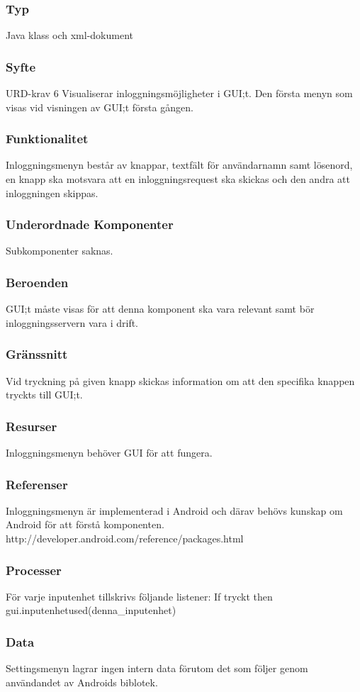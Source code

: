 \subsubsection{Typ}
Java klass och xml-dokument

\subsubsection{Syfte}
URD-krav 6
Visualiserar inloggningsmöjligheter i GUI;t. Den första menyn som visas vid visningen av GUI;t första gången. 

\subsubsection{Funktionalitet}
Inloggningsmenyn består av knappar, textfält för användarnamn samt lösenord, en knapp ska motsvara att en inloggningsrequest ska skickas och den andra att inloggningen skippas.

\subsubsection{Underordnade Komponenter}
Subkomponenter saknas.

\subsubsection{Beroenden}
GUI;t måste visas för att denna komponent ska vara relevant samt bör inloggningsservern vara i drift.

\subsubsection{Gränssnitt}
Vid tryckning på given knapp skickas information om att den specifika knappen tryckts till GUI;t.

\subsubsection{Resurser}
Inloggningsmenyn behöver GUI för att fungera.

\subsubsection{Referenser}
Inloggningsmenyn är implementerad i Android och därav behövs kunskap om Android för att förstå komponenten.
http://developer.android.com/reference/packages.html

\subsubsection{Processer}
För varje inputenhet tillskrivs följande listener:
If tryckt
then gui.inputenhetused(denna_inputenhet)

\subsubsection{Data}
Settingsmenyn lagrar ingen intern data förutom det som följer genom användandet av Androids biblotek.